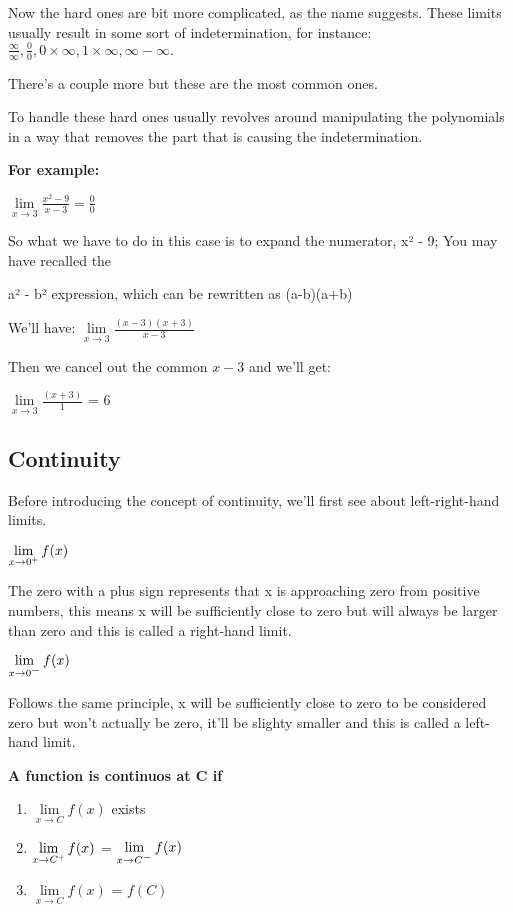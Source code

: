 \documentclass{article}
\newcommand{\minus}{\scalebox{0.8}{$-$}}
\newcommand{\plus}{\scalebox{0.6}{$+$}}
\begin{document}
Now the hard ones are bit more complicated, as the name suggests. These
limits usually result in some sort of indetermination, for instance:
{\large $\frac{\infty}{\infty}, \frac{0}{0}, 0 \times \infty, 1 \times \infty, \infty - \infty.$}

There's a couple more but these are the most common ones.

To handle these hard ones usually revolves around manipulating the polynomials in a 
way that removes the part that is causing the indetermination.

\textbf{For example:}

{\large
    $\lim\limits_{x \to 3} \frac{x^{2} - 9}{x-3} = \frac{0}{0}$
}

So what we have to do in this case is to expand the numerator, x² - 9;
You may have recalled the 

a² - b² expression, which can be rewritten as (a-b)(a+b)

We'll have: {\large $\lim\limits_{x \to 3} \frac{(x-3)(x+3)}{x-3}$}

Then we cancel out the common $x - 3$ and we'll get:

{\large $\lim\limits_{x \to 3} \frac{(x+3)}{1} $} = 6

\newpage
\subsection{Continuity}
Before introducing the concept of continuity, we'll first see about
left-right-hand limits. 

{\large $\lim\limits_{x \to 0^{\plus}} f(x)$} 

The zero with a plus sign
represents that x is approaching zero from positive numbers, this means
x will be sufficiently close to zero but will always be larger than 
zero and this is called a right-hand limit.

{\large $\lim\limits_{x \to 0^{\minus}} f(x)$} 

Follows the same principle, x will be sufficiently close to zero to be considered
zero but won't actually be zero, it'll be slighty smaller and this is called
a left-hand limit.

\textbf{A function is continuos at C if}

\begin{enumerate}
    \item {\large $\lim\limits_{x \to C} f(x)$} exists
    \item {\large $\lim\limits_{x \to C^{\plus}} f(x)$} =
    {\large $\lim\limits_{x \to C^{\minus}} f(x)$}
    \item {\large $\lim\limits_{x \to C} f(x)$} = $f(C)$
\end{enumerate}
\end{document}

